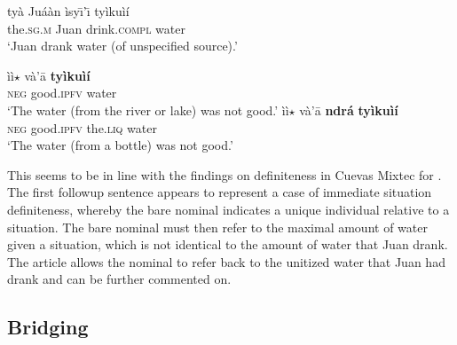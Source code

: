 \documentclass[output=paper,modfonts,nonflat]{langsci/langscibook}
\begin{document}
\ea {}\label{ex:cisneros:69}
\gll
{\ob}ty\`a Ju\'a\`an{\cb} \`isy\=\i'\=\i{} ty\`iku\`i\'i\\
{\db}the.\textsc{sg.m} Juan drink.\textsc{compl} water\\
\glt
`Juan drank water (of unspecified source).'

\ea
\gll
\`i\`i$\star$ v\`a'\=a \textbf{ty\`iku\`i\'i}\\
\textsc{neg} good.\textsc{ipfv} water\\
\glt
`The water (from the river or lake) was not good.'
\ex
\gll
\`i\`i$\star$ v\`a'\=a {\ob}\textbf{ndr\'a} \textbf{ty\`iku\`i\'i}{\cb}\\
\textsc{neg} good.\textsc{ipfv} {\db}the.\textsc{liq} water\\
\glt
`The water (from a bottle) was not good.'
\z 
\z 

This seems to be in line with the findings on definiteness in Cuevas Mixtec for .  The first followup sentence appears to represent a case of immediate situation definiteness, whereby the bare nominal indicates a unique individual relative to a situation.  The bare nominal must then refer to the maximal amount of water given a situation, which is not identical to the amount of water that Juan drank.  The article allows the nominal to refer back to the unitized water that Juan had drank and can be further commented on.

\subsection{Bridging} \label{sec:cisneros:4.3}
\end{document}
